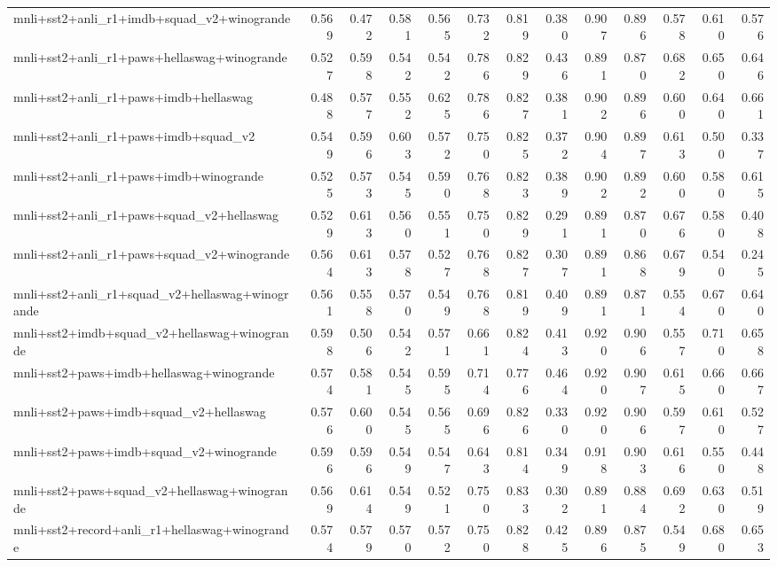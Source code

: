 \begin{table}[t]
\begin{tabular}{lrrrrrrrrrrrr}
    mnli+sst2+anli\_r1+imdb+squad\_v2+winogrande & 0.569 & 0.472 & 0.581 & 0.565 & 0.732 & 0.819 & 0.380 & 0.907 & 0.896 & 0.578 & 0.610 & 0.576 \\
    mnli+sst2+anli\_r1+paws+hellaswag+winogrande & 0.527 & 0.598 & 0.542 & 0.542 & 0.786 & 0.829 & 0.436 & 0.891 & 0.870 & 0.682 & 0.650 & 0.646 \\
    mnli+sst2+anli\_r1+paws+imdb+hellaswag & 0.488 & 0.577 & 0.552 & 0.625 & 0.786 & 0.827 & 0.381 & 0.902 & 0.896 & 0.600 & 0.640 & 0.661 \\
    mnli+sst2+anli\_r1+paws+imdb+squad\_v2 & 0.549 & 0.596 & 0.603 & 0.572 & 0.750 & 0.825 & 0.372 & 0.904 & 0.897 & 0.613 & 0.500 & 0.337 \\
    mnli+sst2+anli\_r1+paws+imdb+winogrande & 0.525 & 0.573 & 0.545 & 0.590 & 0.768 & 0.823 & 0.389 & 0.902 & 0.892 & 0.600 & 0.580 & 0.615 \\
    mnli+sst2+anli\_r1+paws+squad\_v2+hellaswag & 0.529 & 0.613 & 0.560 & 0.551 & 0.750 & 0.829 & 0.291 & 0.891 & 0.870 & 0.676 & 0.580 & 0.408 \\
    mnli+sst2+anli\_r1+paws+squad\_v2+winogrande & 0.564 & 0.613 & 0.578 & 0.527 & 0.768 & 0.827 & 0.307 & 0.891 & 0.868 & 0.679 & 0.540 & 0.245 \\
    mnli+sst2+anli\_r1+squad\_v2+hellaswag+winogrande & 0.561 & 0.558 & 0.570 & 0.549 & 0.768 & 0.819 & 0.409 & 0.891 & 0.871 & 0.554 & 0.670 & 0.640 \\
    mnli+sst2+imdb+squad\_v2+hellaswag+winogrande & 0.598 & 0.506 & 0.542 & 0.571 & 0.661 & 0.824 & 0.413 & 0.920 & 0.906 & 0.557 & 0.710 & 0.658 \\
    mnli+sst2+paws+imdb+hellaswag+winogrande & 0.574 & 0.581 & 0.545 & 0.595 & 0.714 & 0.776 & 0.464 & 0.920 & 0.907 & 0.615 & 0.660 & 0.667 \\
    mnli+sst2+paws+imdb+squad\_v2+hellaswag & 0.576 & 0.600 & 0.545 & 0.565 & 0.696 & 0.826 & 0.330 & 0.920 & 0.906 & 0.597 & 0.610 & 0.527 \\
    mnli+sst2+paws+imdb+squad\_v2+winogrande & 0.596 & 0.596 & 0.549 & 0.547 & 0.643 & 0.814 & 0.349 & 0.918 & 0.903 & 0.616 & 0.550 & 0.448 \\
    mnli+sst2+paws+squad\_v2+hellaswag+winogrande & 0.569 & 0.614 & 0.549 & 0.521 & 0.750 & 0.833 & 0.302 & 0.891 & 0.884 & 0.692 & 0.630 & 0.519 \\
    mnli+sst2+record+anli\_r1+hellaswag+winogrande & 0.574 & 0.579 & 0.570 & 0.572 & 0.750 & 0.828 & 0.425 & 0.896 & 0.875 & 0.549 & 0.680 & 0.653 \\

\end{tabular}
\end{table}
